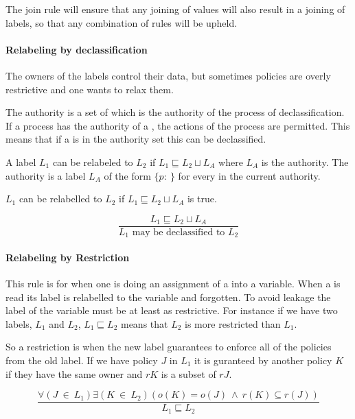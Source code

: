 The join rule will ensure that any joining of values will also result in a joining of labels, so that any combination of rules will be upheld.

\paragraph{Relabeling by declassification}
The owners of the labels control their data, but sometimes policies are overly restrictive and one wants to relax them.

The authority is a set of \principals{} which is the authority of the process of declassification.
If a process has the authority of a \principal{}, the actions of the process are permitted.
This means that if a \principal{} is in the authority set this can be declassified.

A label $L_1$ can be relabeled to $L_2$ if $L_1 \sqsubseteq L_2 \sqcup L_A$ where $L_A$ is the authority.
The authority is a label $L_A$ of the form $\{p: \ \}$ for every \principal{} in the current authority.

$L_1$ can be relabelled to $L_2$ if $L_1 \sqsubseteq L_2 \sqcup L_A$ is true.
\begin{definition}
    $$\frac{L_1 \sqsubseteq L_2 \sqcup L_A}{L_1 \text{ may be declassified to } L_2}$$
\end{definition}

\paragraph{Relabeling by Restriction}
This rule is for when one is doing an assignment of a \xvalue{} into a variable.
When a \xvalue{} is read its label is relabelled to the variable and forgotten.
To avoid leakage the label of the variable must be at least as restrictive.
For instance if we have two labels, $L_1$ and $L_2$, $L_1 \sqsubseteq L_2$ means that $L_2$ is more restricted than $L_1$.

So a restriction is when the new label guarantees to enforce all of the policies from the old label.
If we have policy $J$ in $L_1$ it is guranteed by another policy $K$ if they have the same owner and $rK$ is a subset of $rJ$.
\begin{definition}
$$\frac{\forall (J \ \in \ L_1) \exists (K \ \in \ L_2)(o(K) = o(J) \ \wedge \ r(K) \subseteq r(J))}{L_1 \sqsubseteq L_2}$$
\end{definition}


